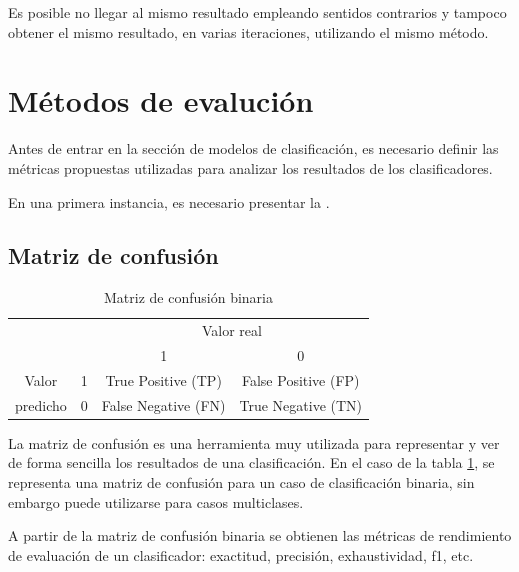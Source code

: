 Es posible no llegar al mismo resultado empleando sentidos contrarios y tampoco obtener el mismo resultado, en varias iteraciones, utilizando el mismo método.


\newpage
\section{Métodos de evalución}

Antes de entrar en la sección de modelos de clasificación, es necesario definir las métricas propuestas utilizadas para analizar los resultados de los clasificadores.

En una primera instancia, es necesario presentar la .

\subsection{Matriz de confusión}

\begin{table}[h]
	\centering
	\caption{Matriz de confusión binaria}
	\label{tab:matriz_confusion}
	\begin{tabular}{cc|cc|}
		\cline{3-4}
		&  & \multicolumn{2}{c|}{Valor real} \\ \cline{3-4} 
		&  & \multicolumn{1}{c|}{1}    & 0   \\ \hline
		\multicolumn{1}{|c|}{Valor}    & 1 & \multicolumn{1}{c|}{True Positive (TP)}  & False Positive (FP) \\ \cline{2-4} 
		\multicolumn{1}{|c|}{predicho} & 0 & \multicolumn{1}{c|}{False Negative (FN)} & True Negative (TN)  \\ \hline
	\end{tabular}
\end{table}

La matriz de confusión es una herramienta muy utilizada para representar y ver de forma sencilla los resultados de una clasificación. En el caso de la tabla \ref{tab:matriz_confusion}, se representa una matriz de confusión para un caso de clasificación binaria, sin embargo puede utilizarse para casos multiclases.

A partir de la matriz de confusión binaria se obtienen las métricas de rendimiento de evaluación de un clasificador: exactitud, precisión, exhaustividad, f1, etc.

